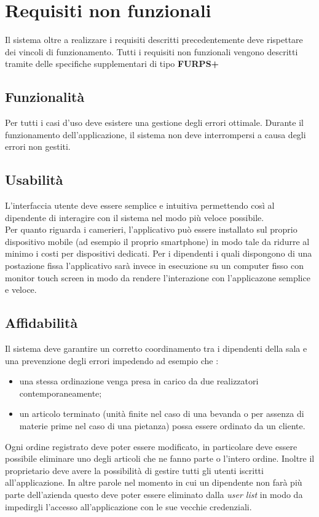 \section{Requisiti non funzionali}
Il sistema oltre a realizzare i requisiti descritti precedentemente deve rispettare dei vincoli di funzionamento. Tutti i requisiti non funzionali vengono descritti tramite delle specifiche supplementari di tipo \textbf{FURPS+}

\subsection{Funzionalità}
Per tutti i casi d'uso deve esistere una gestione degli errori ottimale. Durante il funzionamento dell'applicazione, il sistema non deve interrompersi a causa degli errori non gestiti.

\subsection{Usabilità}
L'interfaccia utente deve essere semplice e intuitiva permettendo così al dipendente di interagire con il sistema nel modo più veloce possibile.
\\Per quanto riguarda i camerieri, l'applicativo può essere installato sul proprio dispositivo mobile (ad esempio il proprio smartphone) in modo tale da ridurre al minimo i costi per dispositivi dedicati.
Per i dipendenti i quali dispongono di una postazione fissa l'applicativo sarà invece in esecuzione su un computer fisso con monitor touch screen in modo da rendere l'interazione con l'applicazone semplice e veloce.

\subsection{Affidabilità}
Il sistema deve garantire un corretto coordinamento tra i dipendenti della sala e una prevenzione degli errori impedendo ad esempio che : 
\begin{itemize}
	\item una stessa ordinazione venga presa in carico da due realizzatori contemporaneamente;
	\item un articolo terminato (unità finite nel caso di una bevanda o per assenza di materie prime nel caso di una pietanza) possa essere ordinato da un cliente.
\end{itemize}
Ogni ordine registrato deve poter essere modificato, in particolare deve essere possibile eliminare uno degli articoli che ne fanno parte o l'intero ordine. 
Inoltre il proprietario deve avere la possibilità di gestire tutti gli utenti iscritti all'applicazione. In altre parole nel momento in cui un dipendente non farà più parte dell'azienda questo deve poter essere eliminato dalla \textit{user list} in modo da impedirgli l'accesso all'applicazione con le sue vecchie credenziali.

